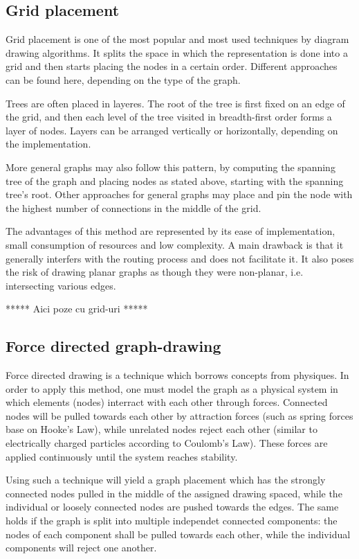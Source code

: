 \begin{itemize}
\subsection{Grid placement}

Grid placement is one of the most popular and most used techniques by diagram drawing algorithms. It splits the space in 
which the representation is done into a grid and then starts placing the nodes in a certain order. Different approaches 
can be found here, depending on the type of the graph. 

Trees are often placed in layeres. The root of the tree is first fixed on an edge of the grid, and then each level of the tree 
visited in breadth-first order forms a layer of nodes. Layers can be arranged vertically or horizontally, depending on the implementation.

More general graphs may also follow this pattern, by computing the spanning tree of the graph and placing nodes as stated above, 
starting with the spanning tree's root. Other approaches for general graphs may place and pin the node with the highest number of 
connections in the middle of the grid.

The advantages of this method are represented by its ease of implementation, small consumption of resources and low complexity. A main drawback 
is that it generally interfers with the routing process and does not facilitate it. It also poses the risk of drawing planar graphs as though 
they were non-planar, i.e. intersecting various edges.


***** Aici poze cu grid-uri *****

\subsection{Force directed graph-drawing}

Force directed drawing is a technique which borrows concepts from physiques. In order to apply this method, one must model the graph as a 
physical system in which elements (nodes) interract with each other through forces. Connected nodes will be pulled towards each other by 
attraction forces (such as spring forces base on Hooke's Law), while unrelated nodes reject each other (similar to electrically charged particles
according to Coulomb's Law). These forces are applied continuously until the system reaches stability.

Using such a technique will yield a graph placement which has the strongly connected nodes pulled in the middle of the assigned drawing spaced, while the 
individual or loosely connected nodes are pushed towards the edges. The same holds if the graph is split into multiple independet connected components: 
the nodes of each component shall be pulled towards each other, while the individual components will reject one another.


\end{itemize}
